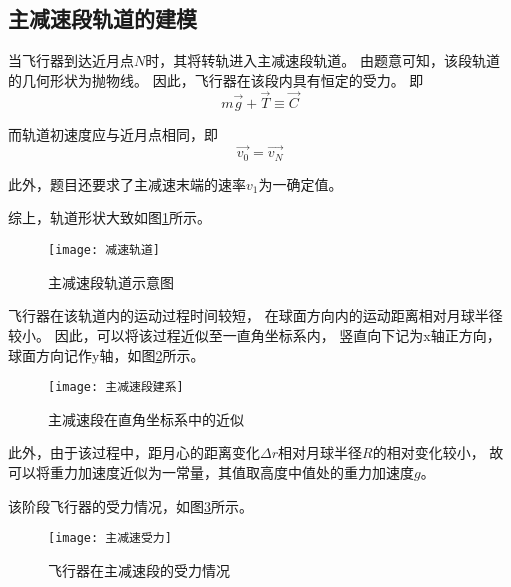 \documentclass[withoutpreface,bwprint]{cumcmthesis} %
\begin{document}
    \subsection{主减速段轨道的建模}
    当飞行器到达近月点$N$时，其将转轨进入主减速段轨道。
    由题意可知，该段轨道的几何形状为抛物线。
    因此，飞行器在该段内具有恒定的受力。
    即
    \[
        m\vec{g} + \vec{T} \equiv \vec{C}
    \]


    而轨道初速度应与近月点相同，即
    \[
        \vec{v_0} = \vec{v_N}
    \]


    此外，题目还要求了主减速末端的速率$v_1$为一确定值。


    综上，轨道形状大致如图\ref{fig:jian_su_gui_dao}所示。
    \begin{figure}[!h]
        \centering
        \texttt{[image: 减速轨道]}
        \caption{主减速段轨道示意图}
        \label{fig:jian_su_gui_dao}
    \end{figure}

    
    飞行器在该轨道内的运动过程时间较短，
    在球面方向内的运动距离相对月球半径较小。
    因此，可以将该过程近似至一直角坐标系内，
    竖直向下记为x轴正方向，球面方向记作y轴，如图\ref{fig:zhu_jian_su_duan_jian_xi}所示。
    \begin{figure}[!h]
        \centering
        \texttt{[image: 主减速段建系]}
        \caption{主减速段在直角坐标系中的近似}
        \label{fig:zhu_jian_su_duan_jian_xi}
    \end{figure}


    此外，由于该过程中，距月心的距离变化$\Delta r$相对月球半径$R$的相对变化较小，
    故可以将重力加速度近似为一常量，其值取高度中值处的重力加速度$g$。
    

    该阶段飞行器的受力情况，如图\ref{fig:zhu_jian_su_shou_li}所示。
    \begin{figure}[!h]
        \centering
        \texttt{[image: 主减速受力]}
        \caption{飞行器在主减速段的受力情况}
        \label{fig:zhu_jian_su_shou_li}
    \end{figure}
\end{document}
